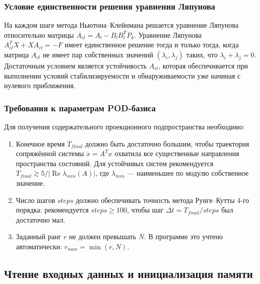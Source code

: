 \documentclass[12pt, a4paper, oneside]{extarticle}
\begin{document}
\subsubsection{Условие единственности решения уравнения Ляпунова}

На каждом шаге метода Ньютона--Клейнмана решается уравнение Ляпунова
относительно матрицы $A_{cl} = A_l - B_l B_l^T P_k$. Уравнение Ляпунова
$A_{cl}^T X + X A_{cl} = -F$ имеет единственное решение тогда и только тогда,
когда матрица $A_{cl}$ не имеет пар собственных значений $(\lambda_i, \lambda_j)$
таких, что $\lambda_i + \lambda_j = 0$. Достаточным условием является
устойчивость $A_{cl}$, которая обеспечивается при выполнении условий
стабилизируемости и обнаруживаемости уже начиная с нулевого приближения.

\subsubsection{Требования к параметрам POD-базиса}

Для получения содержательного проекционного подпространства необходимо:
\begin{enumerate}
    \item Конечное время $T_{final}$ должно быть достаточно большим, чтобы
    траектория сопряжённой системы $\dot{x} = A^T x$ охватила все существенные
    направления пространства состояний. Для устойчивых систем рекомендуется
    $T_{final} \gtrsim 5 / |\operatorname{Re}\lambda_{min}(A)|$, где
    $\lambda_{min}$ --- наименьшее по модулю собственное значение.

    \item Число шагов $steps$ должно обеспечивать точность метода Рунге--Кутты
    4-го порядка: рекомендуется $steps \geq 100$, чтобы шаг
    $\Delta t = T_{final}/steps$ был достаточно мал.

    \item Заданный ранг $r$ не должен превышать $N$. В программе это учтено
    автоматически: $r_{max} = \min(r, N)$.
\end{enumerate}

\subsection{Чтение входных данных и инициализация памяти}
\end{document}
